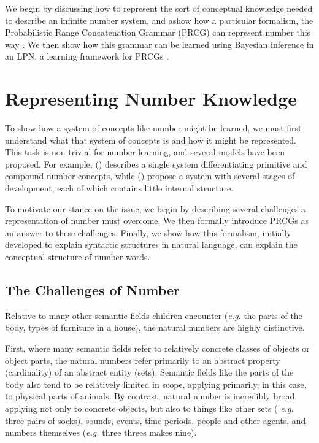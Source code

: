 \documentclass[10pt,letterpaper]{article}
\begin{document}
We begin by discussing how to represent the sort of conceptual
knowledge needed to describe an infinite number system, and ashow how a
particular formalism, the Probabilistic Range Concatenation Grammar
(PRCG) can represent number this way \citep{boullier2005range}. We
then show how this grammar can be learned using Bayesian inference in
an LPN, a learning framework for PRCGs \citep{DecRulTenming}.

\section{Representing Number Knowledge}

To show how a system of concepts like number might be learned, we must
first understand what that system of concepts is and how it might be
represented. This task is non-trivial for number learning, and several
models have been proposed. For example,
\citeauthor{hurford1975linguistic} (\citeyear{hurford1975linguistic})
describes a single system differentiating primitive and compound
number concepts, while \citeauthor{siegler1982development}
(\citeyear{siegler1982development}) propose a system with several
stages of development, each of which contains little internal
structure.

To motivate our stance on the issue, we begin by describing several
challenges a representation of number must overcome. We then formally
introduce PRCGs as an answer to these challenges. Finally, we show how
this formalism, initially developed to explain syntactic structures in
natural language, can explain the conceptual structure of number
words.

\subsection{The Challenges of Number}

Relative to many other semantic fields children encounter ({\it e.g.}
the parts of the body, types of furniture in a house), the natural
numbers are highly distinctive.

First, where many semantic fields refer to relatively concrete classes
of objects or object parts, the natural numbers refer primarily to an
abstract property (cardinality) of an abstract entity (sets). Semantic
fields like the parts of the body also tend to be relatively limited
in scope, applying primarily, in this case, to physical parts of
animals. By contrast, natural number is incredibly broad, applying not
only to concrete objects, but also to things like other sets ({\it
  e.g.} three pairs of socks), sounds, events, time periods, people
and other agents, and numbers themselves ({\it e.g.} three threes
makes nine).
\end{document}
